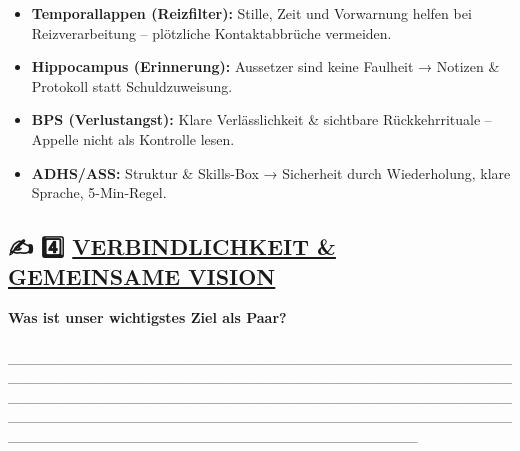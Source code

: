 \begin{itemize}
\tightlist
\item
  \textbf{Temporallappen (Reizfilter):} Stille, Zeit und Vorwarnung helfen bei Reizverarbeitung -- plötzliche Kontaktabbrüche vermeiden.
\end{itemize}

\begin{itemize}
\tightlist
\item
  \textbf{Hippocampus (Erinnerung):} Aussetzer sind keine Faulheit → Notizen \& Protokoll statt Schuldzuweisung.
\end{itemize}

\begin{itemize}
\tightlist
\item
  \textbf{BPS (Verlustangst):} Klare Verlässlichkeit \& sichtbare Rückkehrrituale -- Appelle nicht als Kontrolle lesen.
\end{itemize}

\begin{itemize}
\tightlist
\item
  \textbf{ADHS/ASS:} Struktur \& Skills-Box → Sicherheit durch Wiederholung, klare Sprache, 5-Min-Regel.
\end{itemize}

\hypertarget{section-1}{%
\subsection{}\label{section-1}}

\hypertarget{section-2}{%
\subsection{}\label{section-2}}

\hypertarget{section-3}{%
\subsection{}\label{section-3}}

\hypertarget{verbindlichkeit-gemeinsame-vision-1}{%
\subsection{\texorpdfstring{✍️ 4️⃣ \textbf{\ul{VERBINDLICHKEIT \& GEMEINSAME VISION}}}{✍️ 4️⃣ VERBINDLICHKEIT \& GEMEINSAME VISION}}\label{verbindlichkeit-gemeinsame-vision-1}}

\textbf{Was ist unser wichtigstes Ziel als Paar?}\\
📝 \_\_\_\_\_\_\_\_\_\_\_\_\_\_\_\_\_\_\_\_\_\_\_\_\_\_\_\_\_\_\_\_\_\_\_\_\_\_\_\_\_\_\_\_\_\_\_\_\_\_\_\_\_\_\_\_\_\_\_\_\_\_\_\_\_\_\_\_\_\_\_\_\_\_\_\_\_\_\_\_\_\_\_\_\_\_\_\_\_\_\_\_\_\_\_\_\_\_\_\_\_\_\_\_\_\_\_\_\_\_\_\_\_\_\_\_\_\_\_\_\_\_\_\_\_\_\_\_\_\_\_\_\_\_\_\_\_\_\_\_\_\_\_\_\_\_\_\_\_\_\_\_\_\_\_\_\_\_\_\_\_\_\_\_\_\_\_\_\_\_\_\_\_\_\_\_\_\_\_\_\_\_\_\_\_\_\_\_\_\_\_\_\_\_\_\_\_\_\_\_\_\_\_\_\_\_\_\_\_\_\_\_\_\_\_\_\_\_\_\_\_\_\_\_\_\_\_\_\_\_\_


